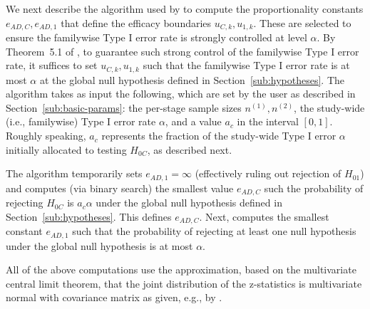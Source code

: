 \documentclass[article]{jss}
\begin{document}
We next describe the algorithm used by   to compute the proportionality constants $e_{AD,C}, e_{AD,1}$ that define the efficacy boundaries $u_{C,k},u_{1,k}$. These are selected to ensure the familywise Type I error rate is strongly controlled at level $\alpha$. By Theorem~5.1 of  \citep{Rosenblum2013AdaptMISTIE}, to guarantee such strong control of the familywise Type I error rate, it suffices to set $u_{C,k},u_{1,k}$ such that the familywise Type I error rate is at most $\alpha$ at the global null hypothesis defined in Section~\ref{sub:hypotheses}.
The algorithm takes as input the following, which are set by the user as described in Section~\ref{sub:basic-params}: the per-stage sample sizes $n^{(1)},n^{(2)}$, the study-wide (i.e., familywise) Type I error rate $\alpha$, and a value $a_c$ in the interval $[0,1]$. 
Roughly speaking, $a_c$ represents the fraction of the study-wide Type I error $\alpha$ initially allocated to testing $H_{0C}$, as described next.

The algorithm temporarily sets $e_{AD,1}= \infty$ (effectively ruling out rejection of $H_{01}$)
and computes (via binary search) the smallest value $e_{AD,C}$ such the probability of rejecting $H_{0C}$ is $a_c α$ under the global null hypothesis defined in Section~\ref{sub:hypotheses}. This defines $e_{AD,C}$. 
Next,   computes the smallest constant $e_{AD,1}$ such that the probability of rejecting at least one null hypothesis under the global null hypothesis  is at most $\alpha$. %

All of the above computations use the approximation, based on the multivariate central limit theorem, that the joint distribution of the  z-statistics is multivariate normal  with covariance matrix as given, e.g., by \cite{JennisonTurnbullBook,Rosenblum2013AdaptMISTIE}.

\end{document}
